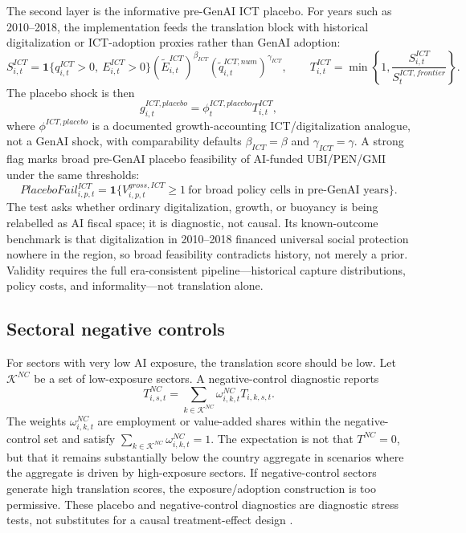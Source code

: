\documentclass[11pt,a4paper]{article}
\begin{document}
The second layer is the informative pre-GenAI ICT placebo. For years such as 2010--2018, the implementation feeds the translation block with historical digitalization or ICT-adoption proxies rather than GenAI adoption:
\begin{equation}
    S^{ICT}_{i,t}=\mathbf{1}\{q^{ICT}_{i,t}>0,\ E^{ICT}_{i,t}>0\}(\tilde E^{ICT}_{i,t})^{\beta_{ICT}}(\tilde q^{ICT,num}_{i,t})^{\gamma_{ICT}},
    \qquad
    T^{ICT}_{i,t}=\min\left\{1,\frac{S^{ICT}_{i,t}}{S^{ICT,frontier}_{t}}\right\}.
\end{equation}
The placebo shock is then
\begin{equation}
    g^{ICT,placebo}_{i,t}=\phi^{ICT,placebo}_{t}T^{ICT}_{i,t},
\end{equation}
where $\phi^{ICT,placebo}$ is a documented growth-accounting ICT/digitalization analogue, not a GenAI shock, with comparability defaults $\beta_{ICT}=\beta$ and $\gamma_{ICT}=\gamma$. A strong flag marks broad pre-GenAI placebo feasibility of AI-funded UBI/PEN/GMI under the same thresholds:
\begin{equation}
    PlaceboFail^{ICT}_{i,p,t}=\mathbf{1}\{V^{gross,ICT}_{i,p,t}\geq1\ \text{for broad policy cells in pre-GenAI years}\}.
\end{equation}
The test asks whether ordinary digitalization, growth, or buoyancy is being relabelled as AI fiscal space; it is diagnostic, not causal. Its known-outcome benchmark is that digitalization in 2010--2018 financed universal social protection nowhere in the region, so broad feasibility contradicts history, not merely a prior. Validity requires the full era-consistent pipeline---historical capture distributions, policy costs, and informality---not translation alone.

\subsection{Sectoral negative controls}

For sectors with very low AI exposure, the translation score should be low. Let $\mathcal{K}^{NC}$ be a set of low-exposure sectors. A negative-control diagnostic reports
\begin{equation}
    T^{NC}_{i,s,t}=\sum_{k\in\mathcal{K}^{NC}}\omega^{NC}_{i,k,t}T_{i,k,s,t}.
\end{equation}
The weights $\omega^{NC}_{i,k,t}$ are employment or value-added shares within the negative-control set and satisfy $\sum_{k\in\mathcal{K}^{NC}}\omega^{NC}_{i,k,t}=1$.
The expectation is not that $T^{NC}=0$, but that it remains substantially below the country aggregate in scenarios where the aggregate is driven by high-exposure sectors. If negative-control sectors generate high translation scores, the exposure/adoption construction is too permissive. These placebo and negative-control diagnostics are diagnostic stress tests, not substitutes for a causal treatment-effect design \citep{bertrand2004trust,athey2017state,lipsitch2010negative}.
\end{document}
